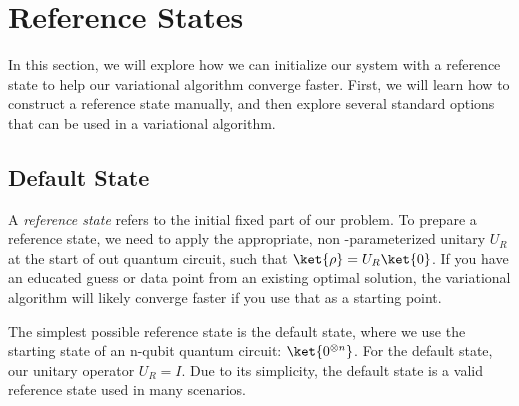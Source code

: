 \documentclass[12pt, oneside]{book}
\theoremstyle{definition}
\theoremstyle{definition}
\theoremstyle{remark}
\begin{document}
\section{Reference States}
In this section, we will explore how we can initialize our system with a reference state to help our variational algorithm converge faster. First, we will learn how to construct a reference state manually, and then explore several standard options that can be used in a variational algorithm.

\subsection{Default State}
A \textit{reference state} refers to the initial fixed part of our problem. To prepare a reference state, we need to apply the appropriate, non -parameterized unitary $U_R$ at the start of out quantum circuit, such that $\ket{\rho}=U_R\ket{0}$. If you have an educated guess or data point from an existing optimal solution, the variational algorithm will likely converge faster if you use that as a starting point.

The simplest possible reference state is the default state, where we use the starting state of an n-qubit quantum circuit: $\ket{0^{\otimes n}}$. For the default state, our unitary operator $U_R=I$. Due to its simplicity, the default state is a valid reference state used in many scenarios.
\end{document}

